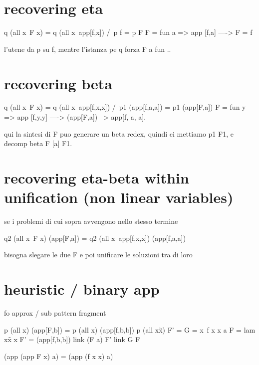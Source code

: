 \documentclass[sigconf,natbib=false]{acmart}
\begin{document}
\section{recovering eta}

\begin{elpicode}
q (all x\ F x) = q (all x\ app[f,x]) /\ p f = p F
F = fun a => app [f,a] ----> F = f
\end{elpicode}

l'utene da p su f, mentre l'istanza pe q forza F a fun .. 

\section{recovering beta}

\begin{elpicode}
  q (all x\ F x) = q (all x\ app[f,x,x]) /\ p1 (app[f,a,a]) = p1 (app[F,a])
  F = fun y => app [f,y,y] ----> (app[F,a]) ~> app[f, a, a].
\end{elpicode}
  
qui la sintesi di F puo generare un beta redex, quindi ci mettiamo
p1 F1, e decomp beta F [a] F1.

\section{recovering eta-beta within unification (non linear variables)}

se i problemi di cui sopra avvengono nello stesso termine

\begin{elpicode}
  q2 (all x\ F x) (app[F,a]) = q2 (all x\ app[f,x,x]) (app[f,a,a])
\end{elpicode}

bisogna slegare le due F e poi unificare le soluzioni tra di loro

\section{heuristic / binary app}

fo approx / sub pattern fragment

\begin{elpicode}
  p (all x\app[F,x,a]) (app[F,b]) = p (all x\app[f,x,x,a]) (app[f,b,b])
  p (all x\G x) F' = 
  G = x\ f x x a
  F = lam x\f x x
  F' = (app[f,b,b])
  link (F a) F'
  link G F
\end{elpicode}



\begin{elpicode}
  (app (app F x) a) = (app (f x x) a)
\end{elpicode}

\printbibliography
\end{document}
